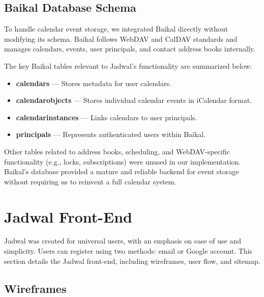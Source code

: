 \subsection{Baikal Database Schema}

To handle calendar event storage, we integrated Baikal directly without modifying its schema. Baikal follows WebDAV and CalDAV standards and manages calendars, events, user principals, and contact address books internally.

The key Baikal tables relevant to Jadwal's functionality are summarized below:

\begin{itemize}
    \item \textbf{calendars} — Stores metadata for user calendars.
    \item \textbf{calendarobjects} — Stores individual calendar events in iCalendar format.
    \item \textbf{calendarinstances} — Links calendars to user principals.
    \item \textbf{principals} — Represents authenticated users within Baikal.
\end{itemize}

Other tables related to address books, scheduling, and WebDAV-specific functionality (e.g., locks, subscriptions) were unused in our implementation. Baikal's database provided a mature and reliable backend for event storage without requiring us to reinvent a full calendar system.

\section{Jadwal Front-End}

Jadwal was created for universal users, with an emphasis on ease of use and simplicity. Users can register using two methods: email or Google account. This section details the Jadwal front-end, including wireframes, user flow, and sitemap.

\subsection{Wireframes}


